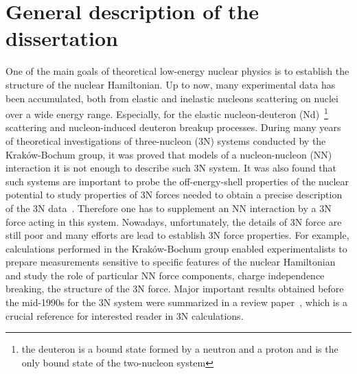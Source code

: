 \chapter{General description of the dissertation}%
\label{overview}
One of the main goals of theoretical low-energy nuclear physics is to establish 
the structure of the nuclear Hamiltonian. Up to now, many experimental data has 
been accumulated, both from elastic and inelastic nucleons scattering on nuclei 
over a wide energy range. Especially, for the elastic nucleon-deuteron 
(Nd)~\footnote{the deuteron is a bound state formed by a neutron and a proton 
and is the only bound state of the two-nucleon system} scattering and 
nucleon-induced deuteron breakup processes. During many years of theoretical 
investigations of three-nucleon (3N) systems conducted by the 
Krak{\'{o}}w-Bochum group, it was proved that models of a nucleon-nucleon (NN) 
interaction it is not enough to describe such 3N system. It was also found that 
such systems are important to probe the off-energy-shell properties of the 
nuclear potential to study properties of 3N forces needed to obtain a precise 
description of the 3N data~\cite{Witaa2001}. Therefore one has to supplement an 
NN interaction by a 3N force acting in this system. Nowadays, unfortunately, 
the details of 3N force are still poor and many efforts are lead to establish 
3N force properties. For example, calculations performed in the 
Krak{\'{o}}w-Bochum group enabled experimentalists to prepare measurements 
sensitive to specific features of the nuclear Hamiltonian and study the role of 
particular NN force components, charge independence breaking, the structure of 
the 3N force. Major important results obtained before the mid-1990s for the 3N 
system were summarized in a review paper~\cite{Glockle1996}, which is a crucial 
reference for interested reader in 3N calculations. 

